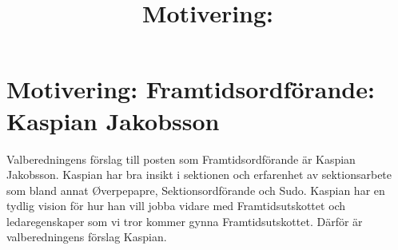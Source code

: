 \documentclass[nopdfbookmarks,a4paper, 11pt, twoside]{article}
\title{Motivering: \titel}
\newcommand{\titel}{Framtidsordförande: Kaspian Jakobsson } %
\begin{document}
\section*{Motivering: \titel}

Valberedningens förslag till posten som Framtidsordförande är Kaspian Jakobsson. Kaspian har bra insikt i sektionen och erfarenhet av sektionsarbete som bland annat Øverpepapre, Sektionsordförande och Sudo. Kaspian har en tydlig vision för hur han vill jobba vidare med Framtidsutskottet och ledaregenskaper som vi tror kommer gynna Framtidsutskottet. Därför är valberedningens förslag Kaspian.  


\end{document}
